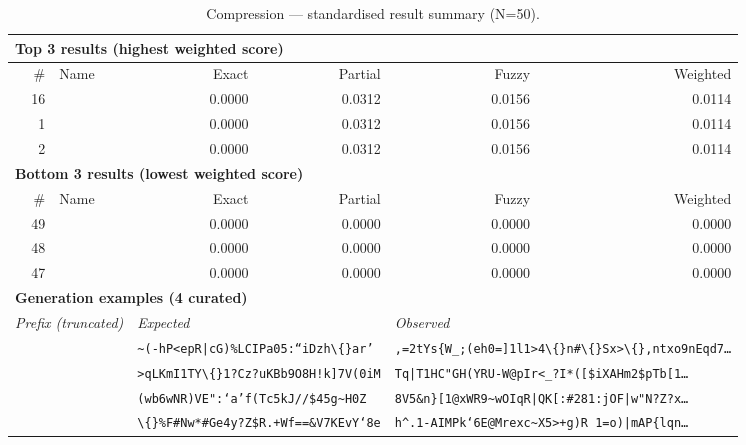 \begin{table}[htbp]
\centering
\caption{Compression — standardised result summary (N=50).}
\label{tab:compression_summary}
\begin{adjustbox}{max width=\textwidth}
\begin{tabular}{r p{5cm} r r r r}
\toprule
\multicolumn{6}{l}{\textbf{Top 3 results (highest weighted score)}} \\
\midrule
\# & Name & Exact & Partial & Fuzzy & Weighted \\
\midrule
16 &  & 0.0000 & 0.0312 & 0.0156 & 0.0114 \\
1 &  & 0.0000 & 0.0312 & 0.0156 & 0.0114 \\
2 &  & 0.0000 & 0.0312 & 0.0156 & 0.0114 \\
\midrule
\multicolumn{6}{l}{\textbf{Bottom 3 results (lowest weighted score)}} \\
\midrule
\# & Name & Exact & Partial & Fuzzy & Weighted \\
\midrule
49 &  & 0.0000 & 0.0000 & 0.0000 & 0.0000 \\
48 &  & 0.0000 & 0.0000 & 0.0000 & 0.0000 \\
47 &  & 0.0000 & 0.0000 & 0.0000 & 0.0000 \\
\midrule
\multicolumn{6}{l}{\textbf{Generation examples (4 curated)}} \\
\midrule
\multicolumn{2}{l}{\textit{Prefix (truncated)}} & \multicolumn{2}{l}{\textit{Expected}} & \multicolumn{2}{l}{\textit{Observed}} \\
\midrule
\multicolumn{2}{l}{\texttt{}} & \multicolumn{2}{l}{\texttt{\textasciitilde{}(-hP<epR|cG)\%LCIPa05:``iDzh\textbackslash\{\}ar'}} & \multicolumn{2}{l}{\texttt{,=2tYs\{W\_;(eh0=]1l1>4\textbackslash\{\}n\#\textbackslash\{\}Sx>\textbackslash\{\},ntxo9nEqd7\ldots}} \\
\multicolumn{2}{l}{\texttt{}} & \multicolumn{2}{l}{\texttt{>qLKmI1TY\textbackslash\{\}1?Cz?uKBb9O8H!k]7V(0iM}} & \multicolumn{2}{l}{\texttt{Tq|T1HC"GH(YRU-W@pIr<\_?I*([\$iXAHm2\$pTb[1\ldots}} \\
\multicolumn{2}{l}{\texttt{}} & \multicolumn{2}{l}{\texttt{(wb6wNR)VE":`a'f(Tc5kJ//\$45g\textasciitilde{}H0Z}} & \multicolumn{2}{l}{\texttt{8V5\&n\}[1@xWR9\textasciitilde{}wOIqR|QK[:\#281:jOF|w"N?Z?x\ldots}} \\
\multicolumn{2}{l}{\texttt{}} & \multicolumn{2}{l}{\texttt{\textbackslash\{\}\%F\#Nw*\#Ge4y?Z\$R.+Wf==\&V7KEvY`8e}} & \multicolumn{2}{l}{\texttt{h\^{}.1-AIMPk`6E@Mrexc\textasciitilde{}X5>+g)R 1=o)|mAP\{lqn\ldots}} \\

\end{tabular}
\end{adjustbox}
\end{table}
